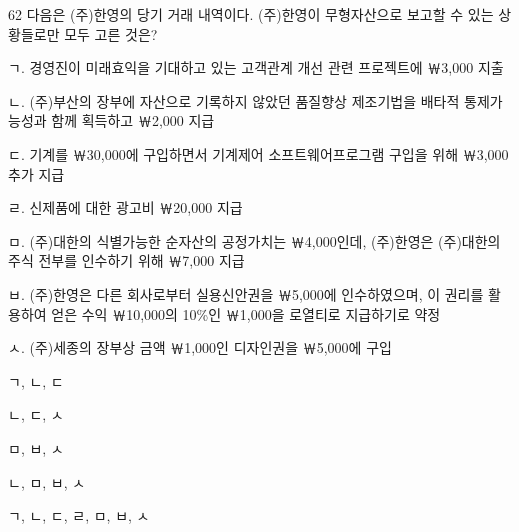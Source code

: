 \begin{question}{62}
다음은 (주)한영의 당기 거래 내역이다. (주)한영이 무형자산으로 보고할 수 있는 상황들로만 모두 고른 것은?
\begin{framedtext}
ㄱ. 경영진이 미래효익을 기대하고 있는 고객관계 개선 관련 프로젝트에 ￦3,000 지출 \par
ㄴ. (주)부산의 장부에 자산으로 기록하지 않았던 품질향상 제조기법을 배타적 통제가능성과 함께 획득하고 ￦2,000 지급 \par
ㄷ. 기계를 ￦30,000에 구입하면서 기계제어 소프트웨어프로그램 구입을 위해 ￦3,000 추가 지급 \par
ㄹ. 신제품에 대한 광고비 ￦20,000 지급 \par
ㅁ. (주)대한의 식별가능한 순자산의 공정가치는 ￦4,000인데, (주)한영은 (주)대한의 주식 전부를 인수하기 위해 ￦7,000 지급 \par
ㅂ. (주)한영은 다른 회사로부터 실용신안권을 ￦5,000에 인수하였으며, 이 권리를 활용하여 얻은 수익 ￦10,000의 10\%인 ￦1,000을 로열티로 지급하기로 약정 \par
ㅅ. (주)세종의 장부상 금액 ￦1,000인 디자인권을 ￦5,000에 구입 \par
\end{framedtext}
\begin{choices}
  \item ㄱ, ㄴ, ㄷ
  \item ㄴ, ㄷ, ㅅ
  \item ㅁ, ㅂ, ㅅ
  \item ㄴ, ㅁ, ㅂ, ㅅ
  \item ㄱ, ㄴ, ㄷ, ㄹ, ㅁ, ㅂ, ㅅ
\end{choices}
\end{question}
